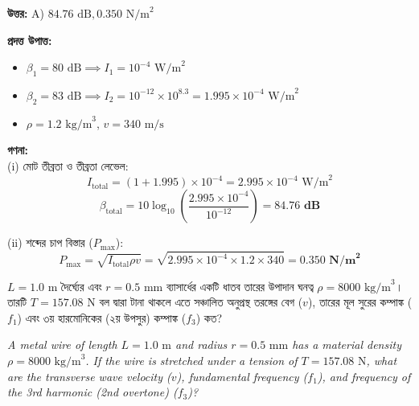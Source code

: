 \documentclass[12pt, a4paper]{article}
\begin{document}
\vspace{0.5em}
\begin{tcolorbox}[answerbox]
    \textbf{\color{success} উত্তর:} A) $84.76\text{ dB}, 0.350\text{ N/m}^2$
\end{tcolorbox}
\vspace{1em}

\begin{tcolorbox}[solutionbox={সমাধান (Solution)}]
    \noindent
    \textbf{প্রদত্ত উপাত্ত:}
    \begin{itemize}[leftmargin=1.5em, itemsep=0.2em]
        \item $\beta_1 = 80\text{ dB} \implies I_1 = 10^{-4}\text{ W/m}^2$
        \item $\beta_2 = 83\text{ dB} \implies I_2 = 10^{-12} \times 10^{8.3} = 1.995 \times 10^{-4}\text{ W/m}^2$
        \item $\rho = 1.2\text{ kg/m}^3$, $v = 340\text{ m/s}$
    \end{itemize}

    \vspace{0.6em}
    \noindent\textbf{গণনা:} \\
    (i) মোট তীব্রতা ও তীব্রতা লেভেল:
    \[ I_{\text{total}} = (1 + 1.995) \times 10^{-4} = 2.995 \times 10^{-4}\text{ W/m}^2 \]
    \[ \beta_{\text{total}} = 10 \log_{10}\left(\frac{2.995 \times 10^{-4}}{10^{-12}}\right) = \mathbf{84.76\text{ dB}} \]
    
    (ii) শব্দের চাপ বিস্তার ($P_{\text{max}}$):
    \[ P_{\text{max}} = \sqrt{I_{\text{total}} \rho v} = \sqrt{2.995 \times 10^{-4} \times 1.2 \times 340} = \mathbf{0.350\text{ N/m}^2} \]
\end{tcolorbox}


\begin{tcolorbox}[questionbox={প্রশ্ন (Question) 20}]
    \noindent
    $L = 1.0\text{ m}$ দৈর্ঘ্যের এবং $r = 0.5\text{ mm}$ ব্যাসার্ধের একটি ধাতব তারের উপাদান ঘনত্ব $\rho = 8000\text{ kg/m}^3$। তারটি $T = 157.08\text{ N}$ বল দ্বারা টানা থাকলে এতে সঞ্চালিত অনুপ্রস্থ তরঙ্গের বেগ ($v$), তারের মূল সুরের কম্পাঙ্ক ($f_1$) এবং ৩য় হারমোনিকের (২য় উপসুর) কম্পাঙ্ক ($f_3$) কত?
    
    \vspace{0.8em}
    \begin{english}
    \noindent\textit{\color{darkgray}
    A metal wire of length $L = 1.0\text{ m}$ and radius $r = 0.5\text{ mm}$ has a material density $\rho = 8000\text{ kg/m}^3$. If the wire is stretched under a tension of $T = 157.08\text{ N}$, what are the transverse wave velocity ($v$), fundamental frequency ($f_1$), and frequency of the 3rd harmonic (2nd overtone) ($f_3$)?
    }
    \end{english}
\end{tcolorbox}
\end{document}
